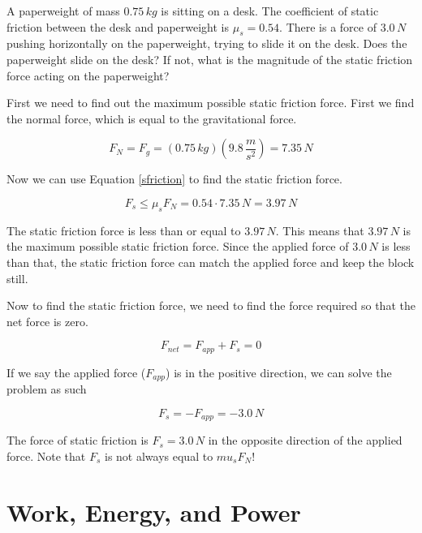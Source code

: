 \documentclass[12pt]{book}
\begin{document}
\begin{exampleblock}

A paperweight of mass $0.75 \, kg$ is sitting on a desk. The coefficient of static friction between the desk and paperweight is $\mu_s = 0.54$. There is a force of $3.0 \, N$ pushing horizontally on the paperweight, trying to slide it on the desk. Does the paperweight slide on the desk? If not, what is the magnitude of the static friction force acting on the paperweight?

\hspace{10pt}

First we need to find out the maximum possible static friction force. First we find the normal force, which is equal to the gravitational force.

\begin{equation}
F_N = F_g = (0.75 \, kg) (9.8 \, \frac{m}{s^2}) = 7.35 \, N
\end{equation}

Now we can use Equation \ref{sfriction} to find the static friction force.

\begin{equation}
F_s \leq \mu_s F_N = 0.54 \cdot 7.35 \, N = 3.97 \, N
\end{equation}

The static friction force is less than or equal to $3.97 \, N$. This means that $3.97 \, N$ is the maximum possible static friction force. Since the applied force of $3.0 \, N$ is less than that, the static friction force can match the applied force and keep the block still.

Now to find the static friction force, we need to find the force required so that the net force is zero. 

\begin{equation}
F_{net} = F_{app} + F_s = 0
\end{equation}

If we say the applied force ($F_{app}$) is in the positive direction, we can solve the problem as such

\begin{equation}
F_s = -F_{app} = - 3.0 \, N
\end{equation}

The force of static friction is $F_s = 3.0 \, N$ in the opposite direction of the applied force. Note that $F_s$ is not always equal to $mu_s F_N$!

\end{exampleblock}



\chapter{Work, Energy, and Power}
\setcounter{example}{1}
\addtocounter{chp}{1}
\end{document}

